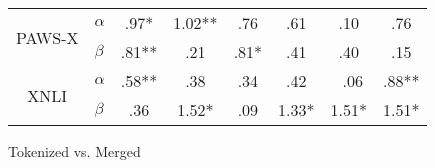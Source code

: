{{\begin{tabular}{llcc|cc|cc}
    \multicolumn{1}{c}{\multirow{2}{*}{PAWS-X}}  & $\alpha$  & \multicolumn{1}{c}{\cellcolor{yellow} .97*}    & \multicolumn{1}{c|}{\cellcolor{purple} 1.02**} & \multicolumn{1}{c}{\cellcolor{yellow} .76}       & \multicolumn{1}{c|}{\cellcolor{purple} .61}    & \multicolumn{1}{c}{\cellcolor{purple} .10}   & \multicolumn{1}{c|}{\cellcolor{purple} .76}   \\
    \multicolumn{1}{c}{}                         & $\beta$   & \multicolumn{1}{c}{\cellcolor{yellow} .81**}   & \multicolumn{1}{c|}{\cellcolor{yellow} .21}    & \multicolumn{1}{c}{\cellcolor{yellow} .81*}      & \multicolumn{1}{c|}{\cellcolor{yellow} .41}    & \multicolumn{1}{c}{\cellcolor{purple} .40}   & \multicolumn{1}{c|}{\cellcolor{purple} .15}   \\ \cline{3-8}
    \multicolumn{1}{c}{\multirow{2}{*}{XNLI}}    & $\alpha$  & \multicolumn{1}{c}{\cellcolor{yellow} .58**}   & \multicolumn{1}{c|}{\cellcolor{yellow} .38}    & \multicolumn{1}{c}{\cellcolor{yellow} .34}       & \multicolumn{1}{c|}{\cellcolor{yellow} .42}    & \multicolumn{1}{c}{\cellcolor{yellow} .06}   & \multicolumn{1}{c|}{\cellcolor{yellow} .88**} \\
    \multicolumn{1}{c}{}                         & $\beta$   & \multicolumn{1}{c}{\cellcolor{yellow} .36}     & \multicolumn{1}{c|}{\cellcolor{purple} 1.52*}  & \multicolumn{1}{c}{\cellcolor{yellow} .09}       & \multicolumn{1}{c|}{\cellcolor{yellow} 1.33*}  & \multicolumn{1}{c}{\cellcolor{yellow} 1.51*} & \multicolumn{1}{c|}{\cellcolor{purple} 1.51*} %
    \end{tabular}
  }
}{Tokenized vs. Merged}

